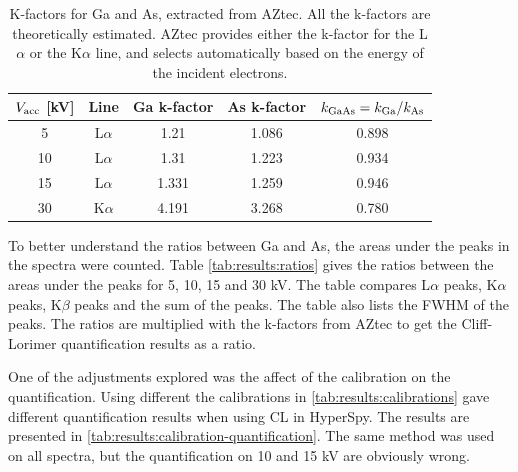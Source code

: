 \begin{table}[h]
    \centering
    \caption{
        K-factors for Ga and As, extracted from AZtec.
        All the k-factors are theoretically estimated.
        AZtec provides either the k-factor for the L$\alpha$ or the K$\alpha$ line, and selects automatically based on the energy of the incident electrons.
    }
    \label{tab:results:k-factors}
    \begin{tabular}{ccccc}
        $V_\textnormal{acc}$ [kV] & Line      & Ga k-factor & As k-factor & $k_\textnormal{GaAs} = k_\textnormal{Ga}/k_\textnormal{As}$ \\ %
        \hline
        5                         & L$\alpha$ & 1.21        & 1.086       & 0.898                                                       \\
        10                        & L$\alpha$ & 1.31        & 1.223       & 0.934                                                       \\
        15                        & L$\alpha$ & 1.331       & 1.259       & 0.946                                                       \\
        30                        & K$\alpha$ & 4.191       & 3.268       & 0.780
    \end{tabular}
\end{table}


To better understand the ratios between Ga and As, the areas under the peaks in the spectra were counted.
Table \cref{tab:results:ratios} gives the ratios between the areas under the peaks for 5, 10, 15 and 30 kV.
The table compares L$\alpha$ peaks, K$\alpha$ peaks, K$\beta$ peaks and the sum of the peaks.
The table also lists the FWHM of the peaks.
The ratios are multiplied with the k-factors from AZtec to get the Cliff-Lorimer quantification results as a ratio.



One of the adjustments explored was the affect of the calibration on the quantification.
Using different the calibrations in \cref{tab:results:calibrations} gave different quantification results when using CL in HyperSpy. %
The results are presented in \cref{tab:results:calibration-quantification}.
The same method was used on all spectra, but the quantification on 10 and 15 kV are obviously wrong.










